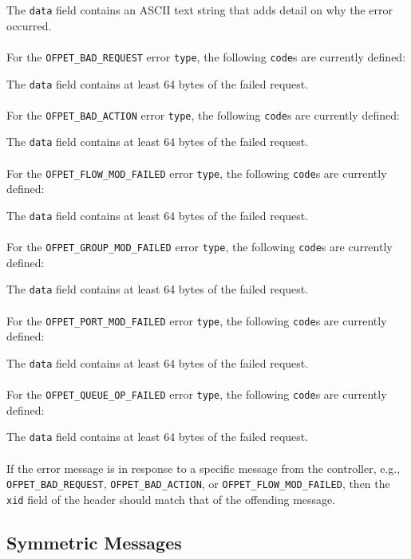 
The \verb|data| field contains an ASCII text string that adds detail on why the error occurred.
\\\\
For the \verb|OFPET_BAD_REQUEST| error \verb|type|, the following \verb|code|s are currently defined:


The \verb|data| field contains at least 64 bytes of the failed request.
\\\\
For the \verb|OFPET_BAD_ACTION| error \verb|type|, the following \verb|code|s are currently defined:


The \verb|data| field contains at least 64 bytes of the failed request.
\\\\
For the \verb|OFPET_FLOW_MOD_FAILED| error \verb|type|, the following \verb|code|s are currently defined:


The \verb|data| field contains at least 64 bytes of the failed request.
\\\\
For the \verb|OFPET_GROUP_MOD_FAILED| error \verb|type|, the following \verb|code|s are currently defined:


The \verb|data| field contains at least 64 bytes of the failed request.
\\\\
For the \verb|OFPET_PORT_MOD_FAILED| error \verb|type|, the following \verb|code|s are currently defined:


The \verb|data| field contains at least 64 bytes of the failed request.
\\\\
For the \verb|OFPET_QUEUE_OP_FAILED| error \verb|type|, the following \verb|code|s are currently defined:


The \verb|data| field contains at least 64 bytes of the failed request.
\\\\
If the error message is in response to a specific message from the controller, e.g., \verb|OFPET_BAD_REQUEST|, \verb|OFPET_BAD_ACTION|, or \verb|OFPET_FLOW_MOD_FAILED|, then the \verb|xid| field of the header should match that of the offending message.

\subsection{Symmetric Messages}
